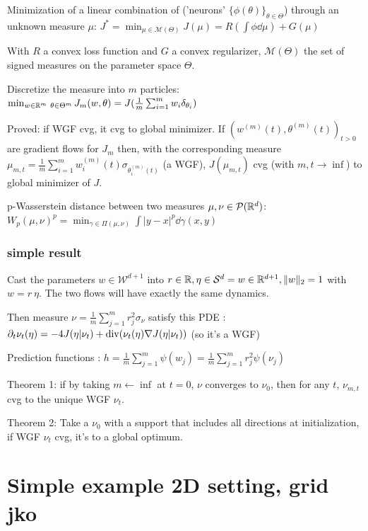 Minimization of a linear combination of ('neurons' $\{\phi(\theta)\}_{\theta \in \Theta}$) through an unknown measure $\mu$: $J^* = \min_{\mu \in \mathcal{M}(\Theta)} J(\mu) = R(\int \phi \dd \mu) + G(\mu)$

With $R$ a convex loss function and $G$ a convex regularizer, $\mathcal{M}(\Theta)$ the set of signed measures on the parameter space $\Theta$.

Discretize the measure into $m$ particles: $\min_{w \in \mathbb{R}^m \\\ \theta \in \Theta^m} J_m(w, \theta) = J( \frac{1}{m} \sum_{i=1}^{m} w_i \delta_{\theta_i})$

Proved: if WGF cvg, it cvg to global minimizer. If $(w^{(m)}(t), \theta^{(m)}(t))_{t>0}$ are gradient flows for $J_m$ then, with the corresponding measure $\mu_{m,t} = \frac{1}{m} \sum_{i=1}^{m} w^{(m)}_i(t) \sigma_{\theta_i^{(m)}(t)}$ (a WGF), $J(\mu_{m, t})$ cvg (with $m, t \rightarrow \inf$) to global minimizer of $J$.

p-Wasserstein distance between two measures $\mu, \nu \in \mathcal{P}(\mathbb{R}^d)$: $W_p(\mu, \nu)^p = \min_{\gamma \in \Pi(\mu, \nu)} \int |y - x|^p \dd \gamma(x, y)$

\subsubsection{simple result}

Cast the parameters $w \in \mathcal{W}^{d+1}$ into $r \in \mathbb{R}, \eta \in \mathcal{S}^d = {w \in \mathbb{R}^{d+1}, \lVert w\rVert_2 = 1}$ with $w = r ~ \eta$. The two flows will have exactly the same dynamics.

Then measure $\nu= \frac{1}{m}\sum_{j=1}^{m} r^2_j \sigma_{\nu}$ satisfy this PDE : $\partial_t \nu_t(\eta) = -4 J(\eta | \nu_t) + \operatorname*{div}(\nu_t(\eta) \nabla J(\eta | \nu_t)) $ (so it's a WGF)

Prediction functions : $h = \frac{1}{m} \sum_{j=1}^{m} \psi(w_j) = \frac{1}{m}\sum_{j=1}^{m} r_j^2 \psi(\nu_j)$

Theorem 1: if by taking $m \leftarrow \inf$ at $t=0$, $\nu$ converges to $\nu_0$, then for any $t$, $\nu_{m, t}$ cvg to the unique WGF $\nu_t$.

Theorem 2: Take a $\nu_0$ with a support that includes all directions at initialization, if WGF $\nu_t$ cvg, it's to a global optimum.

\section{Simple example 2D setting, grid jko}

